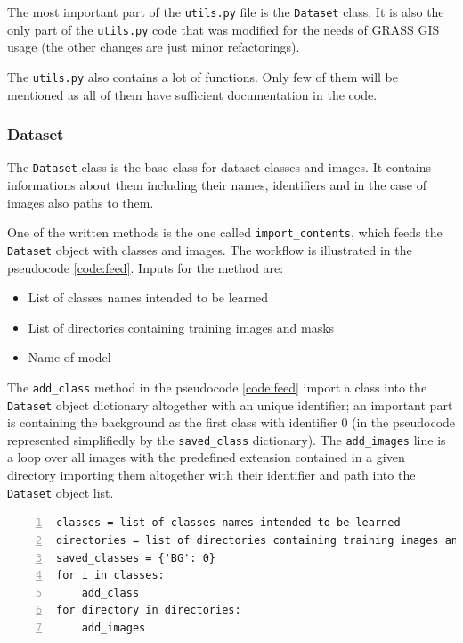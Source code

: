 The most important part of the \verb|utils.py| file is the \verb|Dataset| class. It is also the only part of the \verb|utils.py| code that was modified for the needs of GRASS GIS usage (the other changes are just minor refactorings).

The \verb|utils.py| also contains a lot of functions. Only few of them will be mentioned as all of them have sufficient documentation in the code.

\subsubsection{Dataset}
\label{dataset}

The \verb|Dataset| class is the base class for dataset classes and images. It contains informations about them including their names, identifiers and in the case of images also paths to them.

One of the written methods is the one called \verb|import_contents|, which feeds the \verb|Dataset| object with classes and images. The workflow is illustrated in the pseudocode \ref{code:feed}. Inputs for the method are:
\begin{itemize}
	\item List of classes names intended to be learned
	\item List of directories containing training images and masks
	\item Name of model
\end{itemize}

The \verb|add_class| method in the pseudocode \ref{code:feed} import a class into the \verb|Dataset| object dictionary altogether with an unique identifier; an important part is containing the background as the first class with identifier 0 (in the pseudocode represented simplifiedly by the \verb|saved_class| dictionary). The \verb|add_images| line is a loop over all images with the predefined extension contained in a given directory importing them altogether with their identifier and path into the \verb|Dataset| object list. 

{\scriptsize
\begin{lstlisting}[style=python, caption={import\_contents}, captionpos=b, label=code:feed, deletekeywords={and},
backgroundcolor = \color{light-gray}, numbers=left, breaklines=true]
classes = list of classes names intended to be learned
directories = list of directories containing training images and masks
saved_classes = {'BG': 0}
for i in classes:
    add_class
for directory in directories:
    add_images
\end{lstlisting}}

